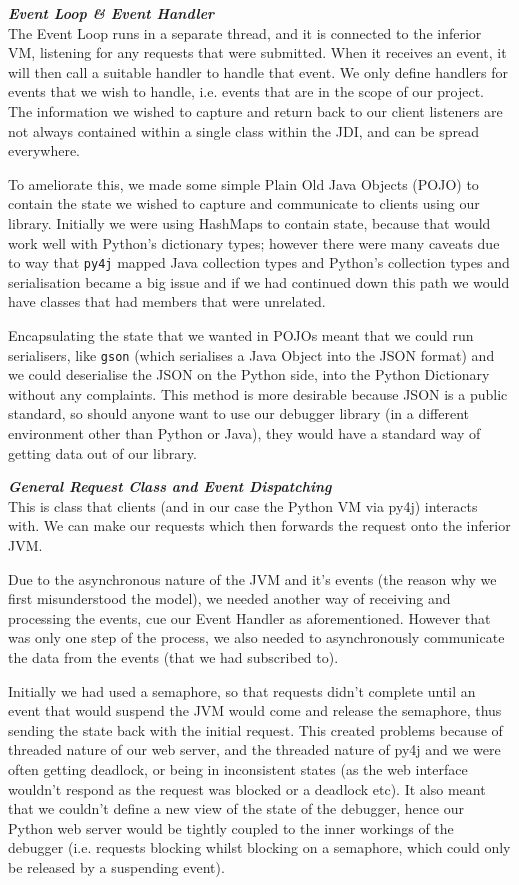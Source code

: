 \documentclass[11pt, a4paper]{article}
\begin{document}
\textbf{\emph{Event Loop \& Event Handler}}\\
The Event Loop runs in a separate thread, and it is connected to the inferior VM, listening for any requests that were submitted.
When it receives an event, it will then call a suitable handler to handle that event.
We only define handlers for events that we wish to handle, i.e. events that are in the scope of our project.
The information we wished to capture and return back to our client listeners are not always contained within a single class within the JDI, and can be spread everywhere.

To ameliorate this, we made some simple Plain Old Java Objects (POJO) to contain the state we wished to capture and communicate to clients using our library.
Initially we were using HashMaps to contain state, because that would work well with Python's dictionary types; however there were many caveats due to way that \texttt{py4j} mapped Java collection types and Python's collection types and serialisation became a big issue and if we had continued down this path we would have classes that had members that were unrelated.

Encapsulating the state that we wanted in POJOs meant that we could run serialisers, like \texttt{gson} (which serialises a Java Object into the JSON format) and we could deserialise the JSON on the Python side, into the Python Dictionary without any complaints.
This method is more desirable because JSON is a public standard, so should anyone want to use our debugger library (in a different environment other than Python or Java), they would have a standard way of getting data out of our library.

\textbf{\emph{General Request Class and Event Dispatching}}\\
This is class that clients (and in our case the Python VM via py4j) interacts with.
We can make our requests which then forwards the request onto the inferior JVM.

Due to the asynchronous nature of the JVM and it's events (the reason why we first misunderstood the model), we needed another way of receiving and processing the events, cue our Event Handler as aforementioned.
However that was only one step of the process, we also needed to asynchronously communicate the data from the events (that we had subscribed to).

Initially we had used a semaphore, so that requests didn't complete until an event that would suspend the JVM would come and release the semaphore, thus sending the state back with the initial request.
This created problems because of threaded nature of our web server, and the threaded nature of py4j and we were often getting deadlock, or being in inconsistent states (as the web interface wouldn't respond as the request was blocked or a deadlock etc).
It also meant that we couldn't define a new view of the state of the debugger, hence our Python web server would be tightly coupled to the inner workings of the debugger (i.e. requests blocking whilst blocking on a semaphore, which could only be released by a suspending event).
\end{document}

